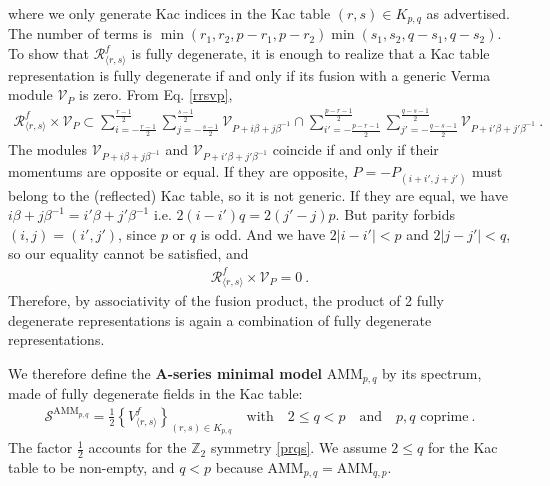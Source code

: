 \documentclass[12pt, a4paper]{article}
\newcommand{\myindex}[1]{\textbf{\boldmath #1}}
\theoremstyle{break}
\begin{document}
where we only generate Kac indices in the Kac table $(r,s)\in K_{p,q}$ as advertised. The number of terms is $\min(r_1,r_2,p-r_1,p-r_2)\min(s_1,s_2,q-s_1,q-s_2)$. To show that $\mathcal{R}^f_{\langle r,s\rangle}$ is fully degenerate, it is enough to realize that a Kac table representation is fully degenerate if and only if its fusion with a generic Verma module $\mathcal{V}_P$ is zero. From Eq. \eqref{rrsvp}, 
\begin{align}
 \mathcal{R}^f_{\langle r,s\rangle}\times \mathcal{V}_P \subset \sum_{i=-\frac{r-1}{2}}^{\frac{r-1}{2}} \sum_{j=-\frac{s-1}{2}}^{\frac{s-1}{2}} \mathcal{V}_{P+i\beta +j\beta^{-1}} \cap \sum_{i'=-\frac{p-r-1}{2}}^{\frac{p-r-1}{2}} \sum_{j'=-\frac{q-s-1}{2}}^{\frac{q-s-1}{2}} \mathcal{V}_{P+i'\beta +j'\beta^{-1}}\ .
\end{align}
The modules $\mathcal{V}_{P+i\beta +j\beta^{-1}}$ and $\mathcal{V}_{P+i'\beta +j'\beta^{-1}}$ coincide if and only if their momentums are opposite or equal. If they are opposite, $P=-P_{(i+i',j+j')}$ must belong to the (reflected) Kac table, so it is not generic. If they are equal, we have $i\beta +j\beta^{-1} = i'\beta +j'\beta^{-1}$ i.e. $2(i-i')q = 2(j'-j)p$. 
But parity forbids $(i,j)=(i',j')$, since $p$ or $q$ is odd. And we have $2|i-i'|<p$ and $2|j-j'|<q$, so our equality cannot be satisfied, and 
\begin{align}
 \mathcal{R}^f_{\langle r,s\rangle}\times \mathcal{V}_P = 0 \ . 
\end{align}
Therefore, by associativity of the fusion product, the product of 2 fully degenerate representations is again a combination of fully degenerate representations.

We therefore define the \myindex{A-series minimal model} AMM$_{p,q}$ by its spectrum, made of fully degenerate fields in the Kac table:
\begin{align}
 \boxed{\mathcal{S}^{\text{AMM}_{p,q}} = \frac12\left\{ V^f_{\langle r,s\rangle} \right\}_{(r,s)\in K_{p,q}} \quad \text{with} \quad 2\leq q<p \quad \text{and} \quad p, q \text{ coprime}}\ .
 \label{samm}
\end{align}
The factor $\frac12$ accounts for the $\mathbb{Z}_2$ symmetry \eqref{prqs}. We assume $2\leq q$ for the Kac table to be non-empty, and 
$q<p$ because AMM$_{p, q}=$AMM$_{q,p}$.
\end{document}
